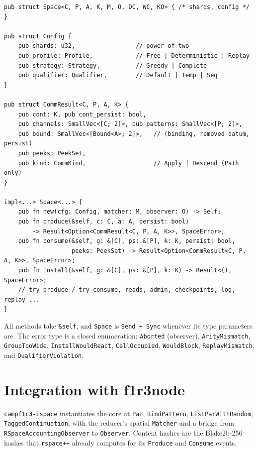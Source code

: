 \documentclass[11pt]{article}
\theoremstyle{plain}
\theoremstyle{definition}
\newcommand{\code}[1]{\texttt{#1}}
\begin{document}
\begin{lstlisting}
pub struct Space<C, P, A, K, M, O, DC, WC, KO> { /* shards, config */ }

pub struct Config {
    pub shards: u32,                 // power of two
    pub profile: Profile,            // Free | Deterministic | Replay
    pub strategy: Strategy,          // Greedy | Complete
    pub qualifier: Qualifier,        // Default | Temp | Seq
}

pub struct CommResult<C, P, A, K> {
    pub cont: K, pub cont_persist: bool,
    pub channels: SmallVec<[C; 2]>, pub patterns: SmallVec<[P; 2]>,
    pub bound: SmallVec<[Bound<A>; 2]>,   // (binding, removed datum, persist)
    pub peeks: PeekSet,
    pub kind: CommKind,                   // Apply | Descend (Path only)
}

impl<...> Space<...> {
    pub fn new(cfg: Config, matcher: M, observer: O) -> Self;
    pub fn produce(&self, c: C, a: A, persist: bool)
        -> Result<Option<CommResult<C, P, A, K>>, SpaceError>;
    pub fn consume(&self, g: &[C], ps: &[P], k: K, persist: bool,
                   peeks: PeekSet) -> Result<Option<CommResult<C, P, A, K>>, SpaceError>;
    pub fn install(&self, g: &[C], ps: &[P], k: K) -> Result<(), SpaceError>;
    // try_produce / try_consume, reads, admin, checkpoints, log, replay ...
}
\end{lstlisting}

All methods take \code{\&self}, and \code{Space} is \code{Send + Sync} whenever its type
parameters are. The error type is a closed enumeration: \code{Aborted}
(observer), \code{ArityMismatch}, \code{GroupTooWide}, \code{InstallWouldReact},
\code{CellOccupied}, \code{WouldBlock}, \code{ReplayMismatch}, and
\code{QualifierViolation}.

\section{Integration with f1r3node}\label{sec:integration}

\code{campf1r3-ispace} instantiates the core at \code{Par}, \code{BindPattern},
\code{ListParWithRandom}, \code{TaggedContinuation}, with the reducer's spatial
\code{Matcher} and a bridge from \code{RSpaceAccountingObserver} to \code{Observer}.
Content hashes are the Blake2b-256 hashes that \code{rspace++} already computes for its
\code{Produce} and \code{Consume} events.
\end{document}
